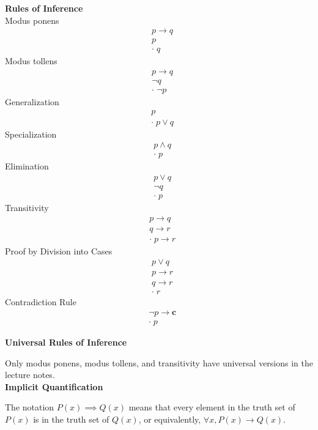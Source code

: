 \documentclass[a4paper]{article}
\newcommand{\subheading}[1]{{\scriptsize\textbf{#1}}}
\begin{document}
\begin{multicols*}{4}
\subheading{Rules of Inference}\\
Modus ponens
\begin{eqnarray*}
  &p \rightarrow q \\
  &p \\
  &\boldsymbol{\cdot}\; q
\end{eqnarray*}
Modus tollens
\begin{eqnarray*}
  &p \rightarrow q \\
  &\neg q \\
  &\boldsymbol{\cdot}\; \neg p
\end{eqnarray*}
Generalization
\begin{eqnarray*}
  &p\\
  &\boldsymbol{\cdot}\; p \lor q
\end{eqnarray*}
Specialization
\begin{eqnarray*}
  &p \land q\\
  &\boldsymbol{\cdot}\; p
\end{eqnarray*}
Elimination
\begin{eqnarray*}
  &p \lor q\\
  &\neg q\\
  &\boldsymbol{\cdot}\; p
\end{eqnarray*}
Transitivity
\begin{eqnarray*}
  &p \rightarrow q\\
  &q \rightarrow r\\
  &\boldsymbol{\cdot}\; p \rightarrow r
\end{eqnarray*}
Proof by Division into Cases
\begin{eqnarray*}
  &p \lor q\\
  &p \rightarrow r\\
  &q \rightarrow r\\
  &\boldsymbol{\cdot}\; r
\end{eqnarray*}
Contradiction Rule
\begin{eqnarray*}
  &\neg p \rightarrow \textbf{c}\\
  &\boldsymbol{\cdot}\; p
\end{eqnarray*}

\subheading{Universal Rules of Inference}

Only modus ponens, modus tollens, and transitivity have universal versions in
the lecture notes.\\

\subheading{Implicit Quantification}

The notation $P(x) \implies Q(x)$ means that every element in the truth set of
$P(x)$ is in the truth set of $Q(x)$, or equivalently, $\forall x, P(x)
\rightarrow Q(x)$.\\


\end{multicols*}
\end{document}
